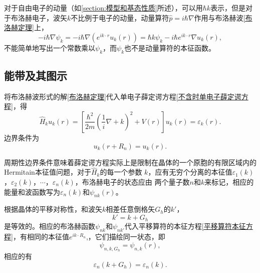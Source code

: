             对于自由电子的动量（如\autoref{section:模型和基态性质}所述），可以用$\hbar k$表示，但是对于布洛赫电子，波矢$k$不比例于电子的动量，动量算符$\hat{p}=i\hbar\nabla$作用与布洛赫波\autoref{布洛赫定理}上，
            \begin{equation}
                -i\hbar\nabla\psi_k=-i\hbar\nabla\left( e^{ik\cdot r}u_k(r) \right)=\hbar k\psi_k-i\hbar e^{ik\cdot r}\nabla u_k(r),
            \end{equation}
            不能简单地写出一个常数乘以$\psi_k$，而$\psi_k$也不是动量算符的本征函数。

        \subsection{能带及其图示}
            将布洛赫波形式的解\autoref{布洛赫定理}代入单电子薛定谔方程\autoref{不含时单电子薛定谔方程}，得
            \begin{equation}
                \hat{H}_ku_k(r)=\left[ \frac{\hbar^2}{2m}\left( \frac{1}{i}\nabla+k \right)^2+V(r) \right]u_k(r)=\varepsilon_k(r)\label{布洛赫形式的单电子薛定谔方程}.
            \end{equation}
            边界条件为
            \begin{equation}
                u_k(r+R_n)=u_k(r).
            \end{equation}

            周期性边界条件意味着薛定谔方程实际上是限制在晶体的一个原胞的有限区域内的Hermitain本征值问题，对于$\hat{H}_k$的每一个参数
            $k$，应有无穷个分离的本征值$\varepsilon_1(k)$，$\varepsilon_2(k)$，$\cdots$，$\varepsilon_n(k)$，布洛赫电子的状态应由
            两个量子数$n$和$k$来标记，相应的能量和波函数写为$\varepsilon_n(k)$和$\psi_{nk}(r)$。

            根据晶体的平移对称性，和波矢$k$相差任意倒格矢$G_h$的$k'$，
            \begin{equation}
                k'=k+G_h
            \end{equation}
            是等效的。相应的布洛赫函数$\psi_{nk}$和$\psi_{nk'}$代入平移算符的本征方程\autoref{平移算符本征方程}，有相同的本征值$e^{ik\cdot R_n}$,，它们描绘同一状态，即
            \begin{equation}
                \psi_{n,k,G_h}=\psi_{n,k}(r),
            \end{equation}
            相应的有
            \begin{equation}
                \varepsilon_n(k+G_h)=\varepsilon_n(k).
            \end{equation}
            
